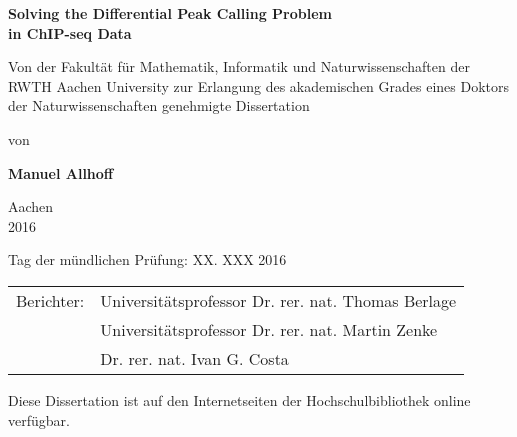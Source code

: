 \begin{titlepage}
\large
\begin{center}


\begin{doublespacing} 
\vspace*{1cm}

{\Large{\bf{ Solving the Differential Peak Calling Problem\\ in ChIP-seq Data}}}


\vspace{2cm}

\begin{minipage}[b]{14cm}
\centering
Von der Fakult\"at f\"ur Mathematik, Informatik und Naturwissenschaften der RWTH Aachen University zur Erlangung des akademischen Grades eines Doktors der Naturwissenschaften genehmigte Dissertation
\end{minipage}

\vspace{2cm}


von

\textbf{Manuel Allhoff}

\vspace{1cm}

Aachen\\ 2016

\end{doublespacing} 
\end{center}

\cleardoublepage
\pagestyle{empty}

\vspace*{\fill}

\noindent
Tag der mündlichen Prüfung: XX. XXX 2016 
\\

\noindent
\begin{tabular}{@{}ll}
Berichter: 	& Universitätsprofessor Dr. rer. nat. Thomas Berlage \\
		& Universitätsprofessor Dr. rer. nat. Martin Zenke \\
		& Dr. rer. nat. Ivan G. Costa\\
\end{tabular}


\vspace{1cm}

\noindent
{\small Diese Dissertation ist auf den Internetseiten der Hochschulbibliothek online verfügbar.}

\cleardoublepage
\end{titlepage}
